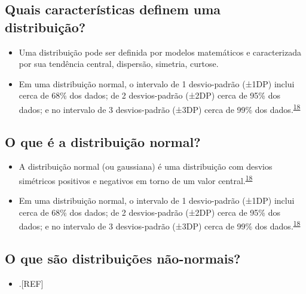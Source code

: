\documentclass[
]{book}
\providecommand{\tightlist}{%
  \setlength{\itemsep}{0pt}\setlength{\parskip}{0pt}}
\begin{document}
\hypertarget{quais-caracteruxedsticas-definem-uma-distribuiuxe7uxe3o}{%
\subsection{Quais características definem uma distribuição?}\label{quais-caracteruxedsticas-definem-uma-distribuiuxe7uxe3o}}

\begin{itemize}
\item
  Uma distribuição pode ser definida por modelos matemáticos e caracterizada por sua tendência central, dispersão, simetria, curtose.
\item
  Em uma distribuição normal, o intervalo de 1 desvio-padrão (±1DP) inclui cerca de 68\% dos dados; de 2 desvios-padrão (±2DP) cerca de 95\% dos dados; e no intervalo de 3 desvios-padrão (±3DP) cerca de 99\% dos dados.\textsuperscript{\protect\hyperlink{ref-Ali2016}{18}}
\end{itemize}

\hypertarget{o-que-uxe9-a-distribuiuxe7uxe3o-normal}{%
\subsection{O que é a distribuição normal?}\label{o-que-uxe9-a-distribuiuxe7uxe3o-normal}}

\begin{itemize}
\item
  A distribuição normal (ou gaussiana) é uma distribuição com desvios simétricos positivos e negativos em torno de um valor central.\textsuperscript{\protect\hyperlink{ref-Ali2016}{18}}
\item
  Em uma distribuição normal, o intervalo de 1 desvio-padrão (±1DP) inclui cerca de 68\% dos dados; de 2 desvios-padrão (±2DP) cerca de 95\% dos dados; e no intervalo de 3 desvios-padrão (±3DP) cerca de 99\% dos dados.\textsuperscript{\protect\hyperlink{ref-Ali2016}{18}}
\end{itemize}

\hypertarget{o-que-suxe3o-distribuiuxe7uxf5es-nuxe3o-normais}{%
\subsection{O que são distribuições não-normais?}\label{o-que-suxe3o-distribuiuxe7uxf5es-nuxe3o-normais}}

\begin{itemize}
\tightlist
\item
  .{[}REF{]}
\end{itemize}
\end{document}
